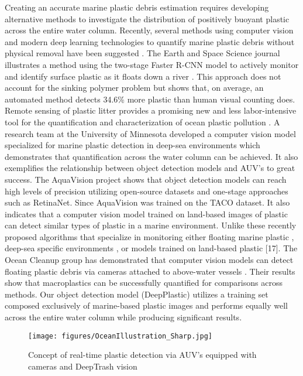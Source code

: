 \documentclass[a4paper,fleqn]{cas-dc}
\begin{document}
Creating an accurate marine plastic debris estimation requires developing alternative methods to investigate the distribution of positively buoyant plastic across the entire water column. 
Recently, several methods using computer vision and modern deep learning technologies to quantify marine plastic debris without physical removal have been suggested \cite{oceancleanup} \cite{fulton2018robotic}.
The Earth and Space Science journal illustrates a method using the two-stage Faster R-CNN model to actively monitor and identify surface plastic as it floats down a river \cite{oceancleanup}. This approach does not account for the sinking polymer problem but shows that, on average, an automated method detects 34.6\% more plastic than human visual counting does.
Remote sensing of plastic litter provides a promising new and less labor-intensive tool for the quantification and characterization of ocean plastic pollution \cite{rs13173401}. A research team at the University of Minnesota developed a computer vision model specialized for marine plastic detection in deep-sea environments \cite{fulton2018robotic} which demonstrates that quantification across the water column can be achieved. It also exemplifies the relationship between object detection models and AUV’s to great success.
The AquaVision project \cite{PANWAR2020100026} shows that object detection models can reach high levels of precision utilizing open-source datasets and one-stage approaches such as RetinaNet. Since AquaVision was trained on the TACO dataset. It also indicates that a computer vision model trained on land-based images of plastic can detect similar types of plastic in a marine environment.
Unlike these recently proposed algorithms that specialize in monitoring either floating marine plastic \cite{oceancleanup}, deep-sea specific environments \cite{fulton2018robotic}, or models trained on land-based plastic [17]. The Ocean Cleanup group has demonstrated that computer vision models can detect floating plastic debris via cameras attached to above-water vessels \cite{rs13173401}. Their results show that macroplastics can be successfully quantified for comparisons across methods. Our object detection model (DeepPlastic) utilizes a training set composed exclusively of marine-based plastic images and performs equally well across the entire water column while producing significant results.

\begin{figure}[ht]
\centering
\texttt{[image: figures/OceanIllustration\_Sharp.jpg]}
\caption{Concept of real-time plastic detection via AUV's equipped with cameras and DeepTrash vision}
\label{fig_concept}
\end{figure}
\end{document}
